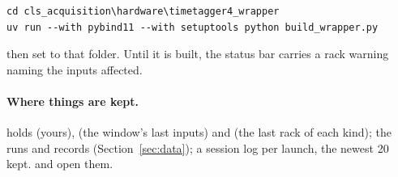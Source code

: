 \begin{lstlisting}
cd cls_acquisition\hardware\timetagger4_wrapper
uv run --with pybind11 --with setuptools python build_wrapper.py
\end{lstlisting}

\noindent then set  to that folder. Until it is built,
the status bar carries a rack warning naming the inputs affected.

\paragraph{Where things are kept.}
 holds  (yours),  (the window's last
inputs) and  (the last rack of each kind);  the runs and
records (Section~\ref{sec:data});  a session log per launch, the newest 20 kept.
 and  open them.
